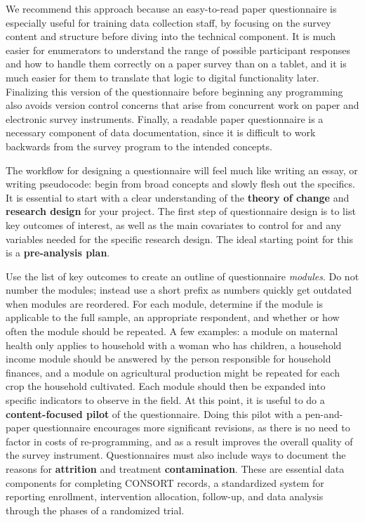 We recommend this approach because an easy-to-read paper questionnaire
is especially useful for training data collection staff,
by focusing on the survey content and structure before diving into the technical component.
It is much easier for enumerators to understand the range of possible participant responses
and how to handle them correctly on a paper survey than on a tablet,
and it is much easier for them to translate that logic to digital functionality later.
Finalizing this version of the questionnaire before beginning any programming
also avoids version control concerns that arise from concurrent work
on paper and electronic survey instruments.
Finally, a readable paper questionnaire is a necessary component of data documentation,
since it is difficult to work backwards from the survey program to the intended concepts.

The workflow for designing a questionnaire will feel much like writing an essay, or writing pseudocode:
begin from broad concepts and slowly flesh out the specifics.
It is essential to start with a clear understanding of the
\textbf{theory of change}
and \textbf{research design} for your project.
The first step of questionnaire design is to list key outcomes of interest,
as well as the main covariates to control for and any variables needed for the specific research design.
The ideal starting point for this is a \textbf{pre-analysis plan}.

Use the list of key outcomes to create an outline of questionnaire \textit{modules}.
Do not number the modules; instead use a short prefix 
as numbers quickly get outdated when modules are reordered.
For each module, determine if the module is applicable to the full sample,
an appropriate respondent, and whether or how often the module should be repeated.
A few examples: a module on maternal health only applies to household with a woman who has children,
a household income module should be answered by the person responsible for household finances,
and a module on agricultural production might be repeated for each crop the household cultivated.
Each module should then be expanded into specific indicators to observe in the field.
At this point, it is useful to do a  \textbf{content-focused pilot}
of the questionnaire.
Doing this pilot with a pen-and-paper questionnaire encourages more significant revisions,
as there is no need to factor in costs of re-programming,
and as a result improves the overall quality of the survey instrument.
Questionnaires must also include ways to document the reasons for \textbf{attrition} and
treatment \textbf{contamination}.
These are essential data components for completing CONSORT records,
a standardized system for reporting enrollment, intervention allocation, follow-up,
and data analysis through the phases of a randomized trial.\cite{begg1996improving}

